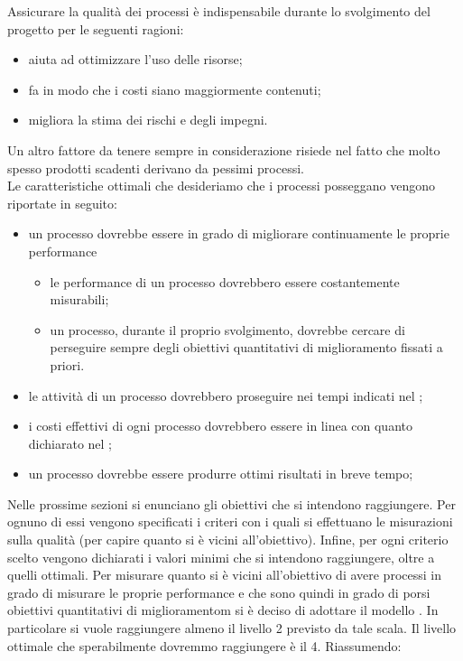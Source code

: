 		  \label{subsec:obiettiviprocesso}
			Assicurare la qualità dei processi è indispensabile durante lo svolgimento del progetto per le seguenti ragioni:
			\begin{itemize}
				\item aiuta ad ottimizzare l'uso delle risorse;
				\item fa in modo che i costi siano maggiormente contenuti;
				\item migliora la stima dei rischi e degli impegni.
			\end{itemize}
			Un altro fattore da tenere sempre in considerazione risiede nel fatto che molto spesso prodotti scadenti derivano da pessimi processi.\\
			Le caratteristiche ottimali che desideriamo che i processi posseggano vengono riportate in seguito:
			\begin{itemize}
				\item un processo dovrebbe essere in grado di migliorare continuamente le proprie performance
				\begin{itemize}
					\item le performance di un processo dovrebbero essere costantemente misurabili;
					\item un processo, durante il proprio svolgimento, dovrebbe cercare di perseguire sempre degli obiettivi quantitativi di miglioramento fissati a priori.
				\end{itemize}
				\item le attività di un processo dovrebbero proseguire nei tempi indicati nel ;
				\item i costi effettivi di ogni processo dovrebbero essere in linea con quanto dichiarato nel ;
				\item un processo dovrebbe essere produrre ottimi risultati in breve tempo;
			\end{itemize}
			Nelle prossime sezioni si enunciano gli obiettivi che si intendono raggiungere. Per ognuno di essi vengono specificati i criteri con i quali si effettuano le misurazioni sulla qualità (per capire quanto si è vicini all'obiettivo). Infine, per ogni criterio scelto vengono dichiarati i valori minimi che si intendono raggiungere, oltre a quelli ottimali.
				Per misurare quanto si è vicini all'obiettivo di avere processi in grado di misurare le proprie performance e che sono quindi in grado di porsi obiettivi quantitativi di miglioramentom si è deciso di adottare il modello . In particolare si vuole raggiungere almeno il livello 2 previsto da tale scala. Il livello ottimale che sperabilmente dovremmo raggiungere è il 4. Riassumendo:
